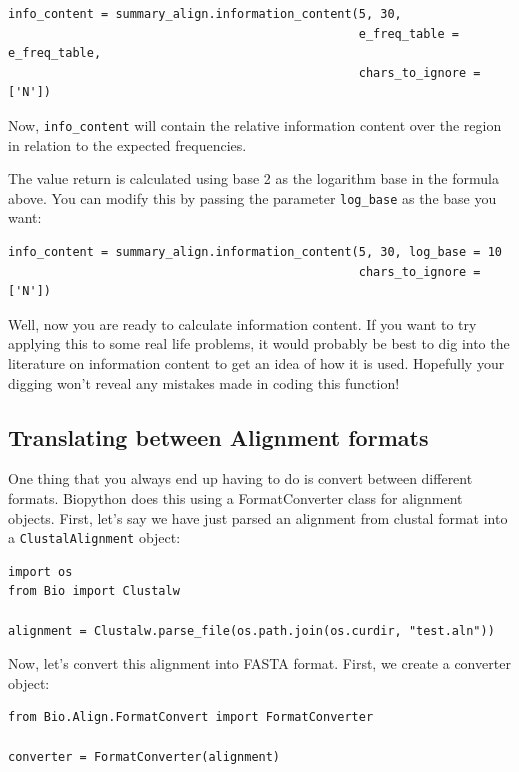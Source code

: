 \documentclass{report}
\begin{document}
\begin{verbatim}
info_content = summary_align.information_content(5, 30,
                                                 e_freq_table = e_freq_table,
                                                 chars_to_ignore = ['N'])
\end{verbatim}

Now, \verb|info_content| will contain the relative information content over the region in relation to the expected frequencies.

The value return is calculated using base 2 as the logarithm base in the formula above. You can modify this by passing the parameter \verb|log_base| as the base you want:

\begin{verbatim}
info_content = summary_align.information_content(5, 30, log_base = 10
                                                 chars_to_ignore = ['N'])
\end{verbatim}

Well, now you are ready to calculate information content. If you want to try applying this to some real life problems, it would probably be best to dig into the literature on information content to get an idea of how it is used. Hopefully your digging won't reveal any mistakes made in coding this function!

\subsection{Translating between Alignment formats}
\label{sec:align_translate}

One thing that you always end up having to do is convert between different formats. Biopython does this using a FormatConverter class for alignment objects. First, let's say we have just parsed an alignment from clustal format into a \verb|ClustalAlignment| object:

\begin{verbatim}
import os
from Bio import Clustalw

alignment = Clustalw.parse_file(os.path.join(os.curdir, "test.aln"))
\end{verbatim}

Now, let's convert this alignment into FASTA format. First, we create a converter object:

\begin{verbatim}
from Bio.Align.FormatConvert import FormatConverter

converter = FormatConverter(alignment)
\end{verbatim}
\end{document}
